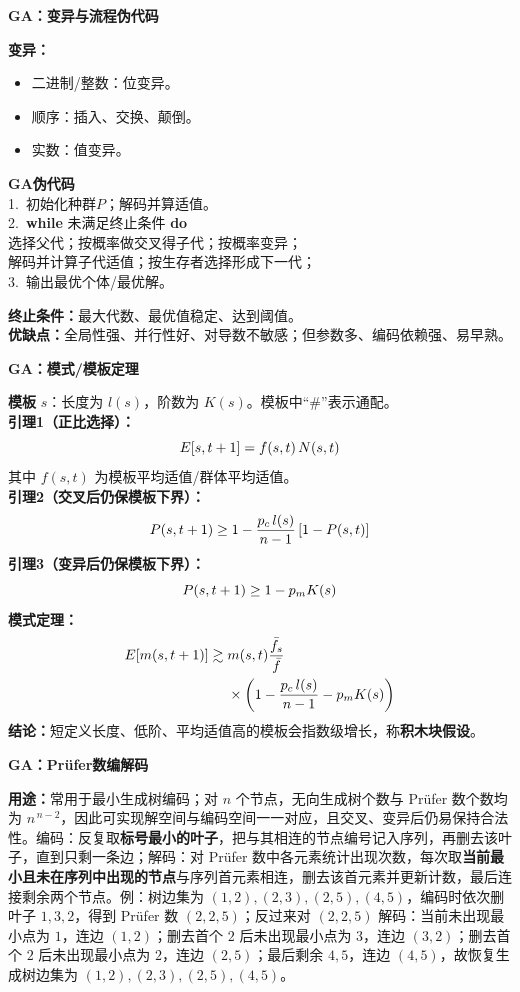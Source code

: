 \documentclass[8pt,a4paper]{ctexart}
\newcommand{\blk}[1]{%
  \par\needspace{2.2\baselineskip}%
  \vspace{1pt}\noindent
  \colorbox{black!10}{\parbox{\dimexpr\columnwidth-2\fboxsep\relax}{\textbf{#1}}}\par
  \vspace{1pt}}
\newcommand{\tightmath}[1]{\[
\vspace{-5pt}#1\vspace{-5pt}
\]}
\newcommand{\codebox}[1]{\begin{tcolorbox}#1\end{tcolorbox}}
\begin{document}
\begin{multicols*}{3}
\blk{GA：变异与流程伪代码}
\textbf{变异：}
\begin{itemize}
\item 二进制/整数：位变异。
\item 顺序：插入、交换、颠倒。
\item 实数：值变异。
\end{itemize}
\codebox{
\textbf{GA伪代码}\\
1.\ 初始化种群$P$；解码并算适值。\\
2.\ \textbf{while} 未满足终止条件 \textbf{do}\\
\quad 选择父代；按概率做交叉得子代；按概率变异；\\
\quad 解码并计算子代适值；按生存者选择形成下一代；\\
3.\ 输出最优个体/最优解。
}
\textbf{终止条件：}最大代数、最优值稳定、达到阈值。\\
\textbf{优缺点：}全局性强、并行性好、对导数不敏感；但参数多、编码依赖强、易早熟。

\blk{GA：模式/模板定理}
\textbf{模板} $s$：长度为 $l(s)$，阶数为 $K(s)$。模板中“\#”表示通配。\\
\textbf{引理1（正比选择）：}
\tightmath{E[s,t+1]=f(s,t)\,N(s,t)}
其中 $f(s,t)$ 为模板平均适值/群体平均适值。\\
\textbf{引理2（交叉后仍保模板下界）：}
\tightmath{P(s,t+1)\ge 1-\frac{p_c\,l(s)}{n-1}\,[1-P(s,t)]}
\textbf{引理3（变异后仍保模板下界）：}
\tightmath{P(s,t+1)\ge 1-p_m K(s)}
\textbf{模式定理：}
\tightmath{
\begin{aligned}
E[m(s,t+1)]\gtrsim\;&m(s,t)\frac{\bar f_s}{\bar f}\\
&\times\left(1-\frac{p_c\,l(s)}{n-1}-p_mK(s)\right)
\end{aligned}}
\textbf{结论：}短定义长度、低阶、平均适值高的模板会指数级增长，称\textbf{积木块假设}。

\blk{GA：Pr\"ufer数编解码}
\textbf{用途：}常用于最小生成树编码；对 $n$ 个节点，无向生成树个数与 Pr\"ufer 数个数均为 $n^{\,n-2}$，因此可实现解空间与编码空间一一对应，且交叉、变异后仍易保持合法性。编码：反复取\textbf{标号最小的叶子}，把与其相连的节点编号记入序列，再删去该叶子，直到只剩一条边；解码：对 Pr\"ufer 数中各元素统计出现次数，每次取\textbf{当前最小且未在序列中出现的节点}与序列首元素相连，删去该首元素并更新计数，最后连接剩余两个节点。例：树边集为 $(1,2),(2,3),(2,5),(4,5)$，编码时依次删叶子 $1,3,2$，得到 Pr\"ufer 数 $(2,2,5)$；反过来对 $(2,2,5)$ 解码：当前未出现最小点为 $1$，连边 $(1,2)$；删去首个 $2$ 后未出现最小点为 $3$，连边 $(3,2)$；删去首个 $2$ 后未出现最小点为 $2$，连边 $(2,5)$；最后剩余 $4,5$，连边 $(4,5)$，故恢复生成树边集为 $(1,2),(2,3),(2,5),(4,5)$。


\end{multicols*}
\end{document}
